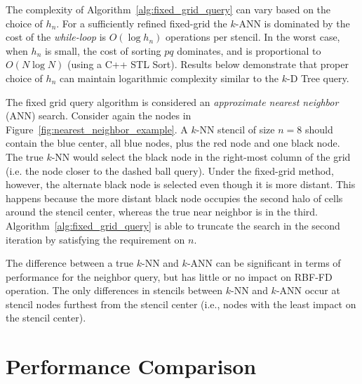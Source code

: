 \documentclass{report}
\begin{document}
The complexity of Algorithm~\ref{alg:fixed_grid_query} can vary based on the choice of $h_n$. For a sufficiently refined fixed-grid the $k$-ANN is dominated by the cost of the \emph{while-loop} is $O(\log h_n)$ operations per stencil. In the worst case, when $h_n$ is small, the cost of sorting $pq$ dominates, and is proportional to $O(N \log N)$ (using a C++ STL Sort).  
Results below demonstrate that proper choice of $h_n$ can maintain logarithmic complexity similar to the $k$-D Tree query. 


The fixed grid query algorithm is considered an \emph{approximate nearest neighbor} (ANN) search. Consider again the nodes in Figure~\ref{fig:nearest_neighbor_example}. A $k$-NN stencil of size $n=8$ should contain the blue center, all blue nodes, plus the red node and one black node. The true $k$-NN would select the black node in the right-most column of the grid (i.e. the node closer to the dashed ball query). Under the fixed-grid method, however, the alternate black node is selected even though it is more distant. This happens because the more distant black node occupies the second halo of cells around the stencil center, whereas the true near neighbor is in the third. Algorithm~\ref{alg:fixed_grid_query} is able to truncate the search in the second iteration by satisfying the requirement on $n$. 


The difference between a true $k$-NN and $k$-ANN can be significant in terms of performance for the neighbor query, but has little or no impact on RBF-FD operation. The only differences in stencils between $k$-NN and $k$-ANN occur at stencil nodes furthest from the stencil center (i.e., nodes with the least impact on the stencil center). 




\section{Performance Comparison}
\label{sec:fixed_grid_benchmarks}
\end{document}
